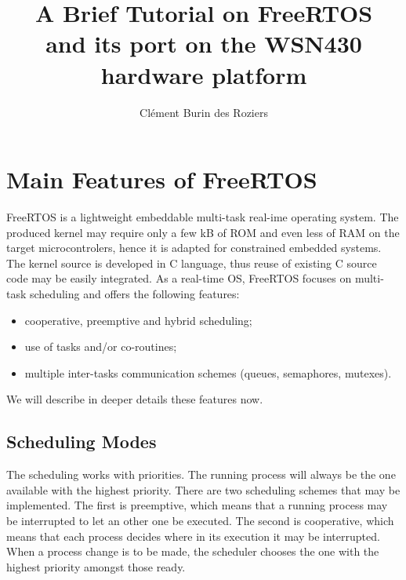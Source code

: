 \documentclass[11pt]{report}
\title{\huge{A Brief Tutorial on FreeRTOS} \\ and its port on the WSN430 hardware platform}
\author{Clément Burin des Roziers}
\begin{document}
   \maketitle


   \tableofcontents

\chapter{Main Features of FreeRTOS}

FreeRTOS is a lightweight embeddable multi-task real-ime operating system. The produced kernel may require only a few kB of ROM and even less of RAM on the target microcontrolers, hence it is adapted for constrained embedded systems. The kernel source is developed in C language, thus reuse of existing C source code may be easily integrated. As a real-time OS, FreeRTOS focuses on multi-task scheduling and offers the following features:
\begin{itemize}
  \item cooperative, preemptive and hybrid scheduling;
  \item use of tasks and/or co-routines;
  \item multiple inter-tasks communication schemes (queues, semaphores, mutexes).
\end{itemize}

We will describe in deeper details these features now.

\section{Scheduling Modes}
The scheduling works with priorities. The running process will always be the one available with the highest priority. There are two scheduling schemes that may be implemented.
The first is preemptive, which means that a running process may be interrupted to let an other one be executed. The second is cooperative, which means that each process decides where in its execution it may be interrupted. When a process change is to be made, the scheduler chooses the one with the highest priority amongst those ready.
\end{document}
